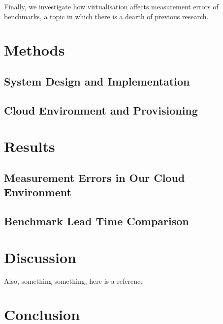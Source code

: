 \documentclass{article}
\begin{document}
\begin{multicols}{2}
Finally, we investigate how virtualisation affects measurement errors of
benchmarks, a topic in which there is a dearth of previous research.

\section*{Methods}

\fixme{\lipsum[100]}

\subsection*{System Design and Implementation}

\subsection*{Cloud Environment and Provisioning}

\section*{Results}

\subsection*{Measurement Errors in Our Cloud Environment}
\fixme{\lipsum[100]}

\subsection*{Benchmark Lead Time Comparison}
\fixme{\lipsum[100]}

\section*{Discussion}

\fixme{\lipsum[66]}

Also, something something, here is a reference~\cite{mell_nist_nodate}

\section*{Conclusion}

\fixme{\lipsum[100]}

\printbibliography

\end{multicols}
\end{document}
